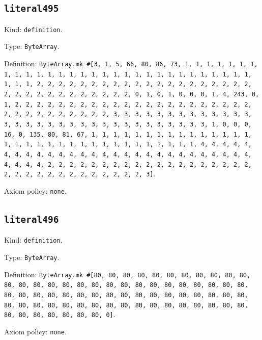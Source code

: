\documentclass[11pt]{article}
\begin{document}
\subsection*{\texttt{literal495}}
\noindent Kind: \texttt{definition}.\par
\noindent Type: \texttt{ByteArray}.\par
\noindent Definition: \texttt{ByteArray.mk \#[3, 1, 5, 66, 80, 86, 73, 1, 1, 1, 1, 1, 1, 1, 1, 1, 1, 1, 1, 1, 1, 1, 1, 1, 1, 1, 1, 1, 1, 1, 1, 1, 1, 1, 1, 1, 1, 1, 1, 1, 2, 2, 2, 2, 2, 2, 2, 2, 2, 2, 2, 2, 2, 2, 2, 2, 2, 2, 2, 2, 2, 2, 2, 2, 2, 2, 2, 2, 2, 2, 2, 2, 0, 1, 0, 1, 0, 0, 0, 1, 4, 243, 0, 1, 2, 2, 2, 2, 2, 2, 2, 2, 2, 2, 2, 2, 2, 2, 2, 2, 2, 2, 2, 2, 2, 2, 2, 2, 2, 2, 2, 2, 2, 2, 2, 2, 3, 3, 3, 3, 3, 3, 3, 3, 3, 3, 3, 3, 3, 3, 3, 3, 3, 3, 3, 3, 3, 3, 3, 3, 3, 3, 3, 3, 3, 3, 3, 3, 1, 0, 0, 0, 16, 0, 135, 80, 81, 67, 1, 1, 1, 1, 1, 1, 1, 1, 1, 1, 1, 1, 1, 1, 1, 1, 1, 1, 1, 1, 1, 1, 1, 1, 1, 1, 1, 1, 1, 1, 1, 1, 1, 4, 4, 4, 4, 4, 4, 4, 4, 4, 4, 4, 4, 4, 4, 4, 4, 4, 4, 4, 4, 4, 4, 4, 4, 4, 4, 4, 4, 4, 4, 4, 4, 2, 2, 2, 2, 2, 2, 2, 2, 2, 2, 2, 2, 2, 2, 2, 2, 2, 2, 2, 2, 2, 2, 2, 2, 2, 2, 2, 2, 2, 2, 2, 2, 3]}.\par
\noindent Axiom policy: \texttt{none}.\par
\subsection*{\texttt{literal496}}
\noindent Kind: \texttt{definition}.\par
\noindent Type: \texttt{ByteArray}.\par
\noindent Definition: \texttt{ByteArray.mk \#[80, 80, 80, 80, 80, 80, 80, 80, 80, 80, 80, 80, 80, 80, 80, 80, 80, 80, 80, 80, 80, 80, 80, 80, 80, 80, 80, 80, 80, 80, 80, 80, 80, 80, 80, 80, 80, 80, 80, 80, 80, 80, 80, 80, 80, 80, 80, 80, 80, 80, 80, 80, 80, 80, 80, 80, 80, 80, 80, 80, 80, 80, 80, 80, 80, 80, 80, 80, 80, 0]}.\par
\noindent Axiom policy: \texttt{none}.\par
\end{document}
